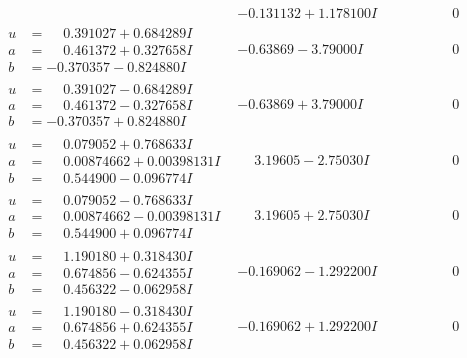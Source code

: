 \documentclass[1p]{elsarticle_modified}
\theoremstyle{definition}
\begin{document}
$$\begin{array}{c|c|c}
 & -0.131132 + 1.178100 I & \phantom{-0.000000 } 0 \\ \hline\begin{aligned}
u &= \phantom{-}0.391027 + 0.684289 I \\
a &= \phantom{-}0.461372 + 0.327658 I \\
b &= -0.370357 - 0.824880 I\end{aligned}
 & -0.63869 - 3.79000 I & \phantom{-0.000000 } 0 \\ \hline\begin{aligned}
u &= \phantom{-}0.391027 - 0.684289 I \\
a &= \phantom{-}0.461372 - 0.327658 I \\
b &= -0.370357 + 0.824880 I\end{aligned}
 & -0.63869 + 3.79000 I & \phantom{-0.000000 } 0 \\ \hline\begin{aligned}
u &= \phantom{-}0.079052 + 0.768633 I \\
a &= \phantom{-}0.00874662 + 0.00398131 I \\
b &= \phantom{-}0.544900 - 0.096774 I\end{aligned}
 & \phantom{-}3.19605 - 2.75030 I & \phantom{-0.000000 } 0 \\ \hline\begin{aligned}
u &= \phantom{-}0.079052 - 0.768633 I \\
a &= \phantom{-}0.00874662 - 0.00398131 I \\
b &= \phantom{-}0.544900 + 0.096774 I\end{aligned}
 & \phantom{-}3.19605 + 2.75030 I & \phantom{-0.000000 } 0 \\ \hline\begin{aligned}
u &= \phantom{-}1.190180 + 0.318430 I \\
a &= \phantom{-}0.674856 - 0.624355 I \\
b &= \phantom{-}0.456322 - 0.062958 I\end{aligned}
 & -0.169062 - 1.292200 I & \phantom{-0.000000 } 0 \\ \hline\begin{aligned}
u &= \phantom{-}1.190180 - 0.318430 I \\
a &= \phantom{-}0.674856 + 0.624355 I \\
b &= \phantom{-}0.456322 + 0.062958 I\end{aligned}
 & -0.169062 + 1.292200 I & \phantom{-0.000000 } 0 \\ \hline\begin{aligned}

\end{aligned}
\end{array}$$
\end{document}
